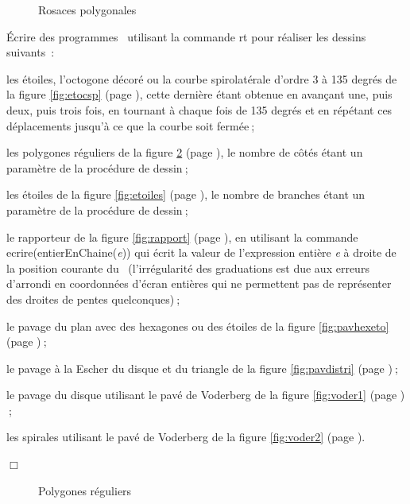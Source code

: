 \begin{figure}[htbp]
 \caption{Rosaces polygonales}\label{fig:rospol}
\end{figure}
\begin{exercices}{Écrire des programmes \python\  utilisant la commande {\idt rt}
pour réaliser les dessins suivants~:

\tiret les étoiles, l'octogone décoré ou la courbe spirolatérale d'ordre 3 à 135 degrés de la figure 
         \ref{fig:etocsp} (page \pageref{fig:etocsp}), cette dernière étant obtenue en avançant une, puis deux, puis
		 trois fois, en tournant à chaque fois de 135 degrés et en répétant ces déplacements jusqu'à ce que
		 la courbe soit fermée$\:$;

\tiret les polygones réguliers de la figure 
         \ref{fig:polyreg} (page \pageref{fig:polyreg}), le nombre de côtés étant un paramètre de la procédure
		 de dessin$\:$;

\tiret les étoiles de la figure 
         \ref{fig:etoiles} (page \pageref{fig:etoiles}), le nombre de branches étant un paramètre de la procédure
		 de dessin$\:$;

\tiret le rapporteur de la figure 
         \ref{fig:rapport} (page \pageref{fig:rapport}), en utilisant la commande
		 {\idt ecrire(entierEnChaine(}{\em e}{\idt ))} qui écrit la valeur de l'expression entière {\em e}
		 à droite de la position courante du \robot\ (l'irrégularité des graduations
		 est due aux erreurs d'arrondi en coordonnées d'écran entières qui ne permettent pas de
		 représenter des droites de pentes quelconques)$\:$;

\tiret le pavage du plan avec des hexagones ou des étoiles de la figure 
         \ref{fig:pavhexeto} (page \pageref{fig:pavhexeto})$\:$;

\tiret le pavage à la Escher \cite{escher1} du disque et du triangle de la figure 
         \ref{fig:pavdistri} (page \pageref{fig:pavdistri})$\:$;

\tiret le pavage du disque utilisant le pavé de Voderberg \cite{voderberg} de la figure 
         \ref{fig:voder1} (page \pageref{fig:voder1})$\:$;

\tiret les spirales utilisant le pavé de Voderberg \cite{voderberg} de la 
         figure \ref{fig:voder2} (page \pageref{fig:voder2}).

\noindent $\Box$}\end{exercices}
\begin{figure}[htbp]
 \caption{Polygones réguliers}\label{fig:polyreg}
\end{figure}
